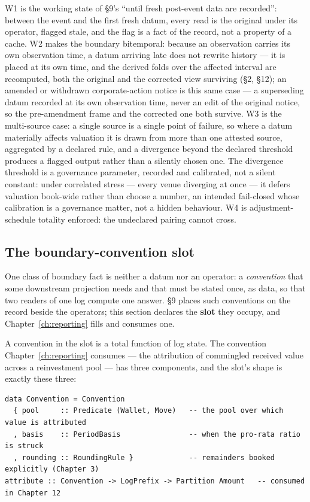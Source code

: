 \noindent W1 is the working state of \S 9's ``until fresh post-event data are recorded'':
between the event and the first fresh datum, every read is the original under its operator,
flagged stale, and the flag is a fact of the record, not a property of a cache. W2 makes the
boundary bitemporal: because an observation carries its own observation time, a datum
arriving late does not rewrite history --- it is placed at its own time, and the derived
folds over the affected interval are recomputed, both the original and the corrected view
surviving (\S 2, \S 12); an amended or withdrawn corporate-action notice is this same
case --- a superseding datum recorded at its own observation time, never an edit of the
original notice, so the pre-amendment frame and the corrected one both survive. W3 is the
multi-source case: a single source is a single point of
failure, so where a datum materially affects valuation it is drawn from more than one
attested source, aggregated by a declared rule, and a divergence beyond the declared
threshold produces a flagged output rather than a silently chosen one. The divergence
threshold is a governance parameter, recorded and calibrated, not a silent constant: under
correlated stress --- every venue diverging at once --- it defers valuation book-wide rather
than choose a number, an intended fail-closed whose calibration is a governance matter, not a
hidden behaviour. W4 is
adjustment-schedule totality enforced: the undeclared pairing cannot cross.

\subsection{The boundary-convention slot}\label{sec:slot}

One class of boundary fact is neither a datum nor an operator: a \emph{convention} that
some downstream projection needs and that must be stated once, as data, so that two readers
of one log compute one answer. \S 9 places such conventions on the record beside the
operators; this section declares the \textbf{slot} they occupy, and
Chapter~\ref{ch:reporting} fills and consumes one.

A convention in the slot is a total function of log state. The convention
Chapter~\ref{ch:reporting} consumes --- the attribution of commingled received value across
a reinvestment pool --- has three components, and the slot's shape is exactly these three:

\begin{lstlisting}
data Convention = Convention
  { pool     :: Predicate (Wallet, Move)   -- the pool over which value is attributed
  , basis    :: PeriodBasis                -- when the pro-rata ratio is struck
  , rounding :: RoundingRule }             -- remainders booked explicitly (Chapter 3)
attribute :: Convention -> LogPrefix -> Partition Amount   -- consumed in Chapter 12
\end{lstlisting}

